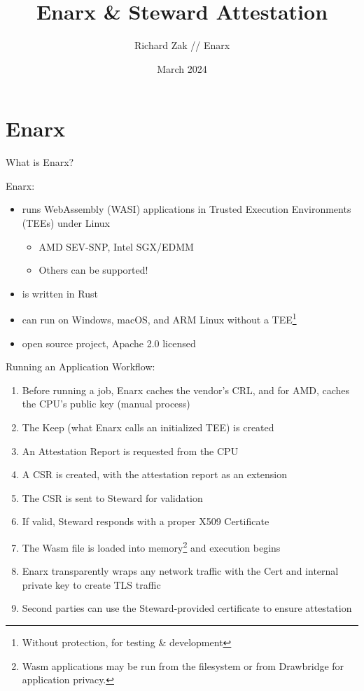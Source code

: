 \documentclass[graphics]{beamer}
\title{Enarx \& Steward Attestation}
\author{Richard Zak // Enarx}
\date{March 2024}
\begin{document}
\begin{frame}
\maketitle
\end{frame}

\frame{\tableofcontents}

\section{Enarx}
\begin{frame}{What is Enarx?}

Enarx:
\begin{itemize}
\item runs WebAssembly (WASI) applications in Trusted Execution Environments (TEEs) under Linux
\begin{itemize}
\item AMD SEV-SNP, Intel SGX/EDMM
\item Others can be supported!
\end{itemize}
\item is written in Rust
\item can run on Windows, macOS, and ARM Linux without a TEE\footnote{Without protection, for testing \& development}
\item open source project, Apache 2.0 licensed
\end{itemize}

\end{frame}

\begin{frame}{Running an Application}
Workflow:
\begin{enumerate}
    \item Before running a job, Enarx caches the vendor's CRL, and for AMD, caches the CPU's public key (manual process)
    \item The Keep (what Enarx calls an initialized TEE) is created
    \item An Attestation Report is requested from the CPU
    \item A CSR is created, with the attestation report as an extension
    \item The CSR is sent to Steward for validation
    \item If valid, Steward responds with a proper X509 Certificate
    \item The Wasm file is loaded into memory\footnote{Wasm applications may be run from the filesystem or from Drawbridge for application privacy.} and execution begins
    \item Enarx transparently wraps any network traffic with the Cert and internal private key to create TLS traffic
    \item Second parties can use the Steward-provided certificate to ensure attestation
\end{enumerate}

\end{frame}
\end{document}

